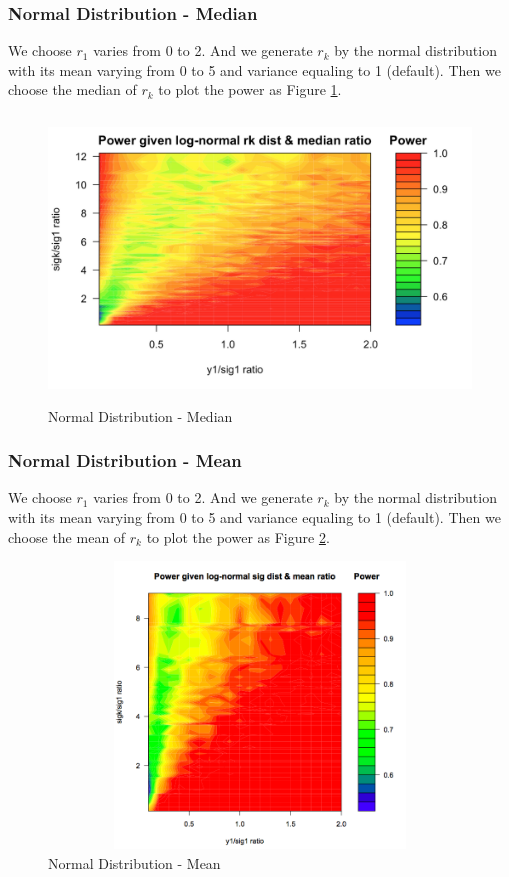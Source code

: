 \documentclass[10pt,english]{article}\usepackage{graphicx, color}
\numberwithin{equation}{section}
\numberwithin{figure}{section}
\begin{document}
\subsubsection{Normal Distribution - Median}
We choose $r_1$ varies from 0 to 2. And we generate $r_k$ by the normal distribution with its mean varying from 0 to 5 and variance equaling to 1 (default). Then we choose the median of $r_k$ to plot the power as Figure \ref{4}.
\begin{figure}[htbp]
\centering\includegraphics[width=4.5in,height=3in]{med}
\caption{\label{4}Normal Distribution - Median}
\end{figure}

\subsubsection{Normal Distribution - Mean}
We choose $r_1$ varies from 0 to 2. And we generate $r_k$ by the normal distribution with its mean varying from 0 to 5 and variance equaling to 1 (default). Then we choose the mean of $r_k$ to plot the power as Figure \ref{5}.
\begin{figure}[htbp]
\centering\includegraphics[width=4.5in,height=3in]{men}
\caption{\label{5}Normal Distribution - Mean}
\end{figure}
\end{document}
